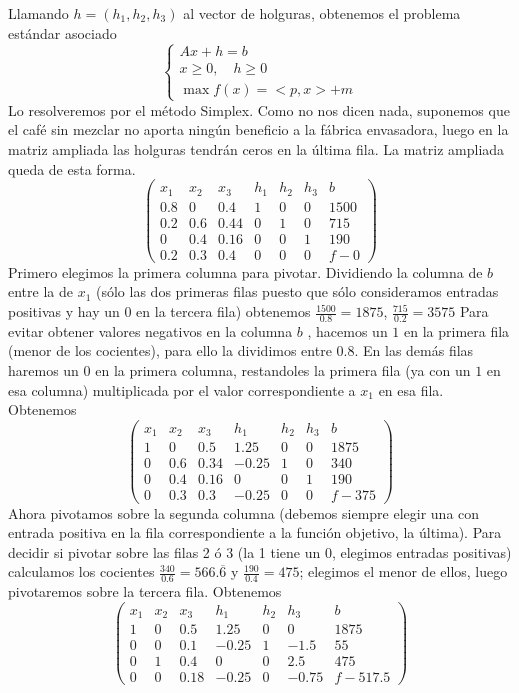\documentclass[a4]{article}
\begin{document}
Llamando $h=(h_1, h_2, h_3)$ al vector de holguras, obtenemos el
problema estándar asociado
\begin{equation} \label{eq:prob-estandar}
  \begin{cases}
    Ax+h= b \\
    x\geq 0, \quad h\geq 0 \\
    \max f(x)=<p,x>+m
  \end{cases}
\end{equation}
Lo resolveremos por el método Simplex. Como no nos dicen nada,
suponemos que el café sin mezclar no aporta ningún beneficio a la
fábrica envasadora, luego en la matriz ampliada las holguras tendrán
ceros en la última fila. La matriz ampliada queda de esta forma.
\[\begin{pmatrix}
    x_1 & x_2 & x_3 & h_1 & h_2 & h_3 & b \\
    0.8 & 0 & 0.4 & 1 & 0 & 0 & 1500 \\
    0.2 & 0.6 & 0.44 & 0 & 1 & 0 & 715 \\
    0 & 0.4 & 0.16 & 0 & 0 & 1 & 190 \\
    0.2 & 0.3 & 0.4 & 0 & 0 & 0 & f-0
  \end{pmatrix}\] Primero elegimos la primera columna para
pivotar. Dividiendo la columna de $b$ entre la de $x_1$ (sólo las dos
primeras filas puesto que sólo consideramos entradas positivas y hay
un $0$ en la tercera fila) obtenemos $\frac{1500}{0.8}=1875$,
$\frac{715}{0.2}=3575$ Para evitar obtener valores negativos en la
columna $b$ , hacemos un $1$ en la primera fila (menor de los
cocientes), para ello la dividimos entre $0.8$. En las demás filas
haremos un $0$ en la primera columna, restandoles la primera fila (ya
con un $1$ en esa columna) multiplicada por el valor correspondiente a
$x_1$ en esa fila. Obtenemos
\[\begin{pmatrix}
    x_1 & x_2 & x_3 & h_1 & h_2 & h_3 & b \\
    1 & 0   & 0.5  & 1.25  & 0 & 0 & 1875 \\
    0 & 0.6 & 0.34 & -0.25 & 1  & 0 & 340 \\
    0 & 0.4 & 0.16 & 0     & 0  & 1 & 190 \\
    0 & 0.3 & 0.3  & -0.25 & 0 & 0 & f-375
  \end{pmatrix}\]
Ahora pivotamos sobre la segunda columna (debemos
siempre elegir una con entrada positiva en la fila correspondiente a
la función objetivo, la última). Para decidir si pivotar sobre las
filas 2 ó 3 (la 1 tiene un 0, elegimos entradas positivas) calculamos
los cocientes $\frac{340}{0.6}=566.\overline{6}$ y 
$\frac{190}{0.4}=475$; elegimos el menor de ellos, luego pivotaremos
sobre la tercera fila. Obtenemos
\[\begin{pmatrix}
    x_1 & x_2 & x_3 & h_1 & h_2 & h_3 & b \\
    1 & 0 & 0.5  & 1.25  & 0 &   0   & 1875 \\
    0 & 0 & 0.1  & -0.25 & 1 & -1.5  & 55 \\
    0 & 1 & 0.4  &   0   & 0 &  2.5  & 475 \\
    0 & 0 & 0.18 & -0.25 & 0 & -0.75 & f-517.5
  \end{pmatrix}\]
\end{document}
